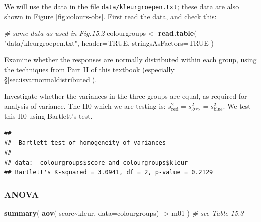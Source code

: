 \documentclass[
]{book}
\newenvironment{Shaded}{\begin{snugshade}}{\end{snugshade}}
\newcommand{\AttributeTok}[1]{\textcolor[rgb]{0.13,0.29,0.53}{#1}}
\newcommand{\CommentTok}[1]{\textcolor[rgb]{0.56,0.35,0.01}{\textit{#1}}}
\newcommand{\ConstantTok}[1]{\textcolor[rgb]{0.56,0.35,0.01}{#1}}
\newcommand{\FunctionTok}[1]{\textcolor[rgb]{0.13,0.29,0.53}{\textbf{#1}}}
\newcommand{\NormalTok}[1]{#1}
\newcommand{\OtherTok}[1]{\textcolor[rgb]{0.56,0.35,0.01}{#1}}
\newcommand{\SpecialCharTok}[1]{\textcolor[rgb]{0.81,0.36,0.00}{\textbf{#1}}}
\newcommand{\StringTok}[1]{\textcolor[rgb]{0.31,0.60,0.02}{#1}}
\begin{document}
We will use the data in the file \texttt{data/kleurgroepen.txt}; these data are also shown in Figure \ref{fig:colours-obs}. First read the data, and check this:

\begin{Shaded}
\begin{Highlighting}[]
\CommentTok{\# same data as used in Fig.15.2}
\NormalTok{colourgroups }\OtherTok{\textless{}{-}} \FunctionTok{read.table}\NormalTok{( }\StringTok{"data/kleurgroepen.txt"}\NormalTok{, }
                            \AttributeTok{header=}\ConstantTok{TRUE}\NormalTok{, }\AttributeTok{stringsAsFactors=}\ConstantTok{TRUE}\NormalTok{ )}
\end{Highlighting}
\end{Shaded}

Examine whether the responses are normally distributed within each group, using
the techniques from Part II of this textbook (especially
§\ref{sec:isvarnormaldistributed}).

Investigate whether the variances in the three groups are equal, as required
for analysis of variance. The H0 which we are testing is:
\(s^2_\textrm{red} = s^2_\textrm{grey} = s^2_\textrm{blue}\). We
test this H0 using Bartlett's test.

\begin{Shaded}
\end{Shaded}

\begin{verbatim}
## 
##  Bartlett test of homogeneity of variances
## 
## data:  colourgroups$score and colourgroups$kleur
## Bartlett's K-squared = 3.0941, df = 2, p-value = 0.2129
\end{verbatim}

\hypertarget{anova-2}{%
\subsubsection{ANOVA}\label{anova-2}}

\begin{Shaded}
\begin{Highlighting}[]
\FunctionTok{summary}\NormalTok{( }\FunctionTok{aov}\NormalTok{( score}\SpecialCharTok{\textasciitilde{}}\NormalTok{kleur, }\AttributeTok{data=}\NormalTok{colourgroups) }\OtherTok{{-}\textgreater{}}\NormalTok{ m01 ) }\CommentTok{\# see Table 15.3}
\end{Highlighting}
\end{Shaded}
\end{document}
